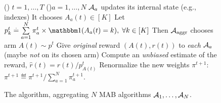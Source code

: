 	\begin{figure}[h!]
		\centering
		\begin{framed}
		\begin{algorithm}[H]
			\For()
            {$t = 1, \dots, T$}{
				\For(){$a = 1, \dots, N$}{
					$\Alg_a$ updates its internal state (e.g., \UCB{} indexes)\;
					It chooses $A_a(t) \in [K]$\;
				}
				Let $p^{t}_k \eqdef \sum\limits_{a = 1}^{N} \pi^{t}_a \times \indic(A_a(t) = k), \;\forall k\in[K]$\;
				Then $\mathcal{A}_{\mathrm{aggr}}$ chooses arm $A(t) \sim p^{t}$\;
				Give \emph{original} reward $(A(t), r(t))$ to \emph{each} $\Alg_a$ (maybe \emph{not} on its chosen arm)\;
				Compute an \emph{unbiased} estimate of the reward, $\widehat{r}(t) = r(t) / p^{t}_{A(t)}$\;
				\For{$a = 1, \dots, N$}{
					\uIf{$\Alg_a$ was trusted, \ie, $A_a(t) = A(t)$}{
						$ \pi^{t+1}_{a} = \exp(\eta_t \widehat{r}(t)) \times \pi^{t}_{a} $
						\tcp*{Trusted more}
					}
					\uElse{
						$ \pi^{t+1}_{a} = \pi^{t}_{a} $
						\tcp*{Do not update the trust now}
					}
				}
				Renormalize the new weights $\pi^{t+1}$: $\pi^{t+1} \eqdef \pi^{t+1} / \sum_{a=1}^{N} \pi^{t+1}_{a}$.
			}
			\caption{The \Aggr{} algorithm, aggregating $N$ MAB algorithms $\mathcal{A}_1,\dots,\mathcal{A}_N$.}
			\label{algo:25:Aggr}
		\end{algorithm}
		\end{framed}
	\end{figure}


